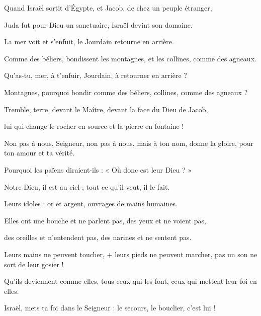 \item Quand Israël sortit d'Égypte, et Jacob, de chez un peuple étranger,

\item Juda fut pour Dieu un sanctuaire, Israël devint son domaine.

\item La mer voit et s'enfuit, le Jourdain retourne en arrière.

\item Comme des béliers, bondissent les montagnes, et les collines, comme des agneaux.

\item Qu'as-tu, mer, à t'enfuir, Jourdain, à retourner en arrière ?

\item Montagnes, pourquoi bondir comme des béliers, collines, comme des agneaux ?

\item Tremble, terre, devant le Maître, devant la face du Dieu de Jacob,

\item lui qui change le rocher en source et la pierre en fontaine !

\item Non pas à nous, Seigneur, non pas à nous, mais à ton nom, donne la gloire, pour ton amour et ta vérité.

\item Pourquoi les païens diraient-ils : « Où donc est leur Dieu ? »

\item Notre Dieu, il est au ciel ; tout ce qu'il veut, il le fait.

\item Leurs idoles : or et argent, ouvrages de mains humaines.

\item Elles ont une bouche et ne parlent pas, des yeux et ne voient pas,

\item des oreilles et n'entendent pas, des narines et ne sentent pas.

\item Leurs mains ne peuvent toucher, + leurs pieds ne peuvent marcher, pas un son ne sort de leur gosier !

\item Qu'ils deviennent comme elles, tous ceux qui les font, ceux qui mettent leur foi en elles.

\item Israël, mets ta foi dans le Seigneur : le secours, le bouclier, c'est lui !

